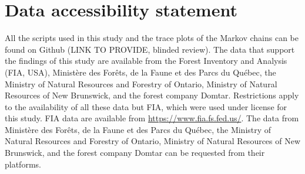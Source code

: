 \section{Data accessibility statement}
All the scripts used in this study and the trace plots of the Markov chains can be found on Github (LINK TO PROVIDE, blinded review). The data that support the findings of this study are available from the Forest Inventory and Analysis (FIA, USA), Ministère des Forêts, de la Faune et des Parcs du Québec, the Ministry of Natural Resources and Forestry of Ontario, Ministry of Natural Resources of New Brunswick, and the forest company Domtar. Restrictions apply to the availability of all these data but FIA, which were used under license for this study. FIA data are available from \url{https://www.fia.fs.fed.us/}. The data from Ministère des Forêts, de la Faune et des Parcs du Québec, the Ministry of Natural Resources and Forestry of Ontario, Ministry of Natural Resources of New Brunswick, and the forest company Domtar can be requested from their platforms.
